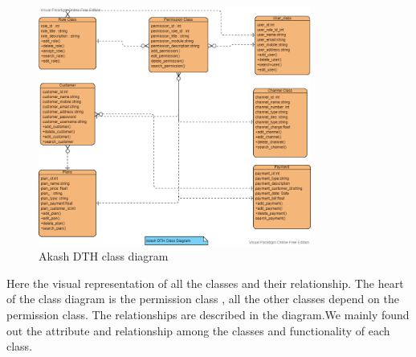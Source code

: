 \begin{spacing}{1}
\begin{figure}[H]
	\centering
	\includegraphics[width=0.8\textwidth]{classDiagram}
	\caption{Akash DTH class diagram}
	\label{fig:classdiagram}
\end{figure}

Here the visual representation of all the classes and their relationship. The heart of the class diagram is the permission class , all the other classes depend on the permission class. The relationships are described in the diagram.We mainly found out the attribute and relationship among the classes and functionality of each class.


\end{spacing}
